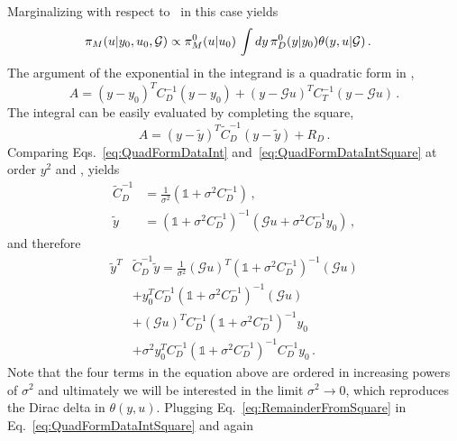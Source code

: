 Marginalizing with respect to \obs\ in this case yields 
\begin{align}
  \label{eq:MarginGaussData}
  \pi_M(u|y_0,u_0,\mathcal{G}) 
  &\propto \pi_{M}^0(u|u_0) \, 
  \int dy\, \pi_{D}^0(y|y_0) 
    \theta(y,u|\mathcal{G}) \, .
\end{align}
The argument of the exponential in the integrand is a quadratic form in \obs, 
\begin{equation}
    \label{eq:QuadFormDataInt}
    A = \left(y-y_0\right)^T C_D^{-1} \left(y-y_0\right) +
    \left(y-\mathcal{G}u\right)^T C_T^{-1} \left(y-\mathcal{G}u\right)\, .
\end{equation}
The integral can be easily evaluated by completing the square, 
\begin{equation}
    \label{eq:QuadFormDataIntSquare}
    A = \left(y-\tilde{y}\right)^T 
    \tilde{C}_D^{-1}
    \left(y-\tilde{y}\right) + R_D\, .
\end{equation}
Comparing Eqs.~\ref{eq:QuadFormDataInt} and~\ref{eq:QuadFormDataIntSquare} at order $y^2$ and \obs, yields
\begin{align}
    \tilde{C}_D^{-1} &= \frac{1}{\sigma^2}
    \left(\mathds{1} + \sigma^2 C_D^{-1}\right)\, , \\
    \tilde{y} &= \left(\mathds{1} + \sigma^2 C_D^{-1}\right)^{-1} 
    \left(
        \mathcal{G}u + \sigma^2 C_D^{-1} y_0
    \right)\, ,
\end{align}
and therefore
\begin{align}
    \tilde{y}^T &\tilde{C}_D^{-1} \tilde{y}
    = \frac{1}{\sigma^2} \left(\mathcal{G}u\right)^T
    \left(\mathds{1}+\sigma^2 C_D^{-1}\right)^{-1} \left(\mathcal{G}u\right) \nonumber\\
    &+ y_0^T C_D^{-1} \left(\mathds{1}+\sigma^2 C_D^{-1}\right)^{-1} 
    \left(\mathcal{G}u\right)  \nonumber \\
    \label{eq:RemainderFromSquare}
    & + \left(\mathcal{G}u\right)^T C_D^{-1} 
    \left(\mathds{1}+\sigma^2 C_D^{-1}\right)^{-1} y_0 \nonumber \\ 
    & + \sigma^2 y_0^T C_D^{-1} \left(\mathds{1}+\sigma^2 C_D^{-1}\right)^{-1} 
    C_D^{-1} y_0\, .
\end{align}
Note that the four terms in the equation above are ordered in increasing powers
of $\sigma^2$ and ultimately we will be interested in the limit $\sigma^2\to 0$,
which reproduces the Dirac delta in $\theta(y,u)$. Plugging
Eq.~\ref{eq:RemainderFromSquare} in Eq.~\ref{eq:QuadFormDataIntSquare} and again
